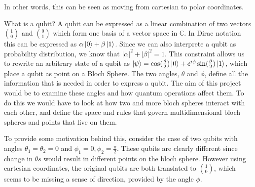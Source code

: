 \documentclass[a4paper,10pt]{article}
\begin{document}
In other words, this can be seen as moving from
cartesian to polar coordinates. 



What is a qubit? A qubit can be expressed as a linear combination of two vectors $\binom{1}{0}$ and $\binom{0}{1}$ which form
one basis of a vector space in $\mathbb{C}$. In Dirac notation this can be expressed as $\alpha \Ket{0} + \beta \Ket{1}$.
Since we can also interprete a qubit as probability distribution, we know that $|\alpha|^2 + |\beta|^2 = 1$. This
constraint allows us to rewrite an arbitrary state of a qubit as $\Ket{\psi} = \cos(\frac{\theta}{2}) \Ket{0} + e^{i\phi}\sin(\frac{\theta}{2})\Ket{1}$,
which place a qubit as point on a Bloch Sphere. The two angles, $\theta$ and $\phi$, define all the information that
is needed in order to express a qubit. The aim of this project would be to examine these angles and how
quantum operations affect them. To do this we would have to look at how two and more bloch spheres interact with each other,
and define the space and rules that govern multidimensional bloch spheres and points that live on them.

To provide some motivation behind this, consider the case of two qubits with angles $\theta_1 = \theta_2 = 0$ and $\phi_1 = 0, \phi_2 = \frac{\pi}{2}$.
These qubits are clearly different since change in $\theta s$ would result in different points on the bloch sphere.
However using cartesian coordinates, the original qubits are both translated to $\binom{1}{0}$, which seems to be
missing a sense of direction, provided by the angle $\phi$. 
\end{document}
